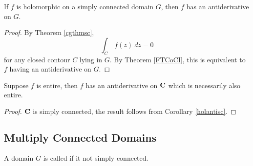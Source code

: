 \medskip

\begin{corollary}\label{holantisc}
If $f$ is holomorphic on a simply connected domain $G$, then $f$ has an antiderivative on $G$.
\end{corollary}
\begin{proof}
By Theorem \ref{cgthmsc}, 
\[\int_C\,f(z)\ dz = 0\]
for any closed contour $C$ lying in $G$. By Theorem \ref{FTCoCI}, this is equivalent to $f$ having an antiderivative on $G$.
\end{proof}

\medskip

\begin{corollary}
Suppose $f$ is entire, then $f$ has an antiderivative on $\mathbf C$ which is necessarily also entire.
\end{corollary}
\begin{proof}
$\mathbf C$ is simply connected, the result follows from Corollary \ref{holantisc}.
\end{proof}

\bigskip

\subsection{Multiply Connected Domains}

\begin{definition}
A domain $G$ is called  if it not simply connected.
\end{definition}

\medskip

